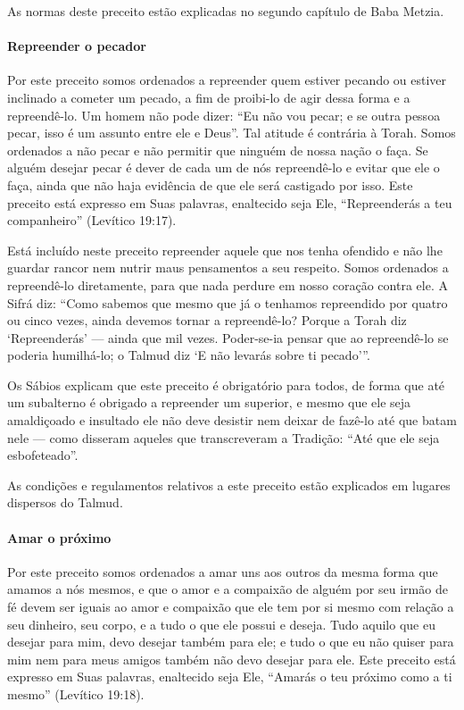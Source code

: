 As normas deste preceito estão explicadas no segundo capítulo de Baba
Metzia.

\paragraph{Repreender o pecador}

Por este preceito somos ordenados a repreender quem estiver pecando ou
estiver inclinado a cometer um pecado, a fim de proibi-lo de agir dessa
forma e a repreendê-lo. Um homem não pode dizer: ``Eu não vou pecar; e
se outra pessoa pecar, isso é um assunto entre ele e Deus''. Tal atitude
é contrária à Torah. Somos ordenados a não pecar e não permitir que
ninguém de nossa nação o faça. Se alguém desejar pecar é dever de cada
um de nós repreendê-lo e evitar que ele o faça, ainda que não haja
evidência de que ele será castigado por isso. Este preceito está
expresso em Suas palavras, enaltecido seja Ele, ``Repreenderás a teu
companheiro'' (Levítico 19:17).

Está incluído neste preceito repreender aquele que nos tenha ofendido e
não lhe guardar rancor nem nutrir maus pensamentos a seu respeito. Somos
ordenados a repreendê-lo diretamente, para que nada perdure em nosso
coração contra ele. A Sifrá diz: ``Como sabemos que mesmo que já o
tenhamos repreendido por quatro ou cinco vezes, ainda devemos tornar a
repreendê-lo? Porque a Torah diz `Repreenderás' --- ainda que mil vezes.
Poder-se-ia pensar que ao repreendê-lo se poderia humilhá-lo; o Talmud
diz `E não levarás sobre ti pecado'''.

Os Sábios explicam que este preceito é obrigatório para todos, de forma
que até um subalterno é obrigado a repreender um superior, e mesmo que
ele seja amaldiçoado e insultado ele não deve desistir nem deixar de
fazê-lo até que batam nele --- como disseram aqueles que transcreveram a
Tradição: ``Até que ele seja esbofeteado''.

As condições e regulamentos relativos a este preceito estão explicados
em lugares dispersos do Talmud.

\paragraph{Amar o próximo}

Por este preceito somos ordenados a amar uns aos outros da mesma forma
que amamos a nós mesmos, e que o amor e a compaixão de alguém por seu
irmão de fé devem ser iguais ao amor e compaixão que ele tem por si
mesmo com relação a seu dinheiro, seu corpo, e a tudo o que ele possui e
deseja. Tudo aquilo que eu desejar para mim, devo desejar também para
ele; e tudo o que eu não quiser para mim nem para meus amigos também não
devo desejar para ele. Este preceito está expresso em Suas palavras,
enaltecido seja Ele, ``Amarás o teu próximo como a ti mesmo'' (Levítico
19:18).


